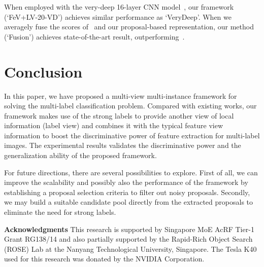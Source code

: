 \documentclass[10pt,twocolumn,letterpaper]{article}
\begin{document}
When employed with the very-deep 16-layer CNN
model~\cite{Simonyan2014}, our framework (`FeV+LV-20-VD') achieves
similar performance as `VeryDeep'. When we averagely fuse the
scores of~\cite{Simonyan2014} and our proposal-based
representation, our method (`Fusion') achieves state-of-the-art
result, outperforming~\cite{Wei2014}.


\section{Conclusion}

In this paper, we have proposed a multi-view multi-instance
framework for solving the multi-label classification problem.
Compared with existing works, our framework makes use of the strong labels to provide another view of local information (label view) and combines it with the typical feature view information to boost the discriminative power of feature
extraction for multi-label images. 
The experimental results validates the discriminative power and the
generalization ability of the proposed framework.

For future directions, there are several possibilities to explore.
First of all, we can improve the scalability and possibly also
the performance of the framework by establishing a
proposal selection criteria to filter out noisy proposals.
Secondly, we may build a suitable candidate pool directly from the
extracted proposals to eliminate the need for strong labels.



\noindent\textbf{Acknowledgments} \small This research is supported by Singapore MoE AcRF Tier-1 Grant
RG138/14 and also partially supported by the Rapid-Rich Object
Search (ROSE) Lab at the Nanyang Technological University,
Singapore. The Tesla K40 used for this research was donated by the NVIDIA Corporation.

{\small


}
\end{document}
